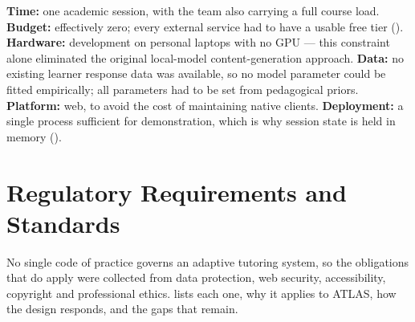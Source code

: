 \textbf{Time:} one academic session, with the team also carrying a full course
load. \textbf{Budget:} effectively zero; every external service had to have a
usable free tier (). \textbf{Hardware:} development on
personal laptops with no GPU --- this constraint alone eliminated the original
local-model content-generation approach. \textbf{Data:} no existing learner
response data was available, so no model parameter could be fitted empirically;
all parameters had to be set from pedagogical priors. \textbf{Platform:} web,
to avoid the cost of maintaining native clients. \textbf{Deployment:} a single
process sufficient for demonstration, which is why session state is held in
memory ().

\section{Regulatory Requirements and Standards}
\label{sec:standards}

No single code of practice governs an adaptive tutoring system, so the
obligations that do apply were collected from data protection, web security,
accessibility, copyright and professional ethics.  lists
each one, why it applies to ATLAS, how the design responds, and the gaps that
remain.

